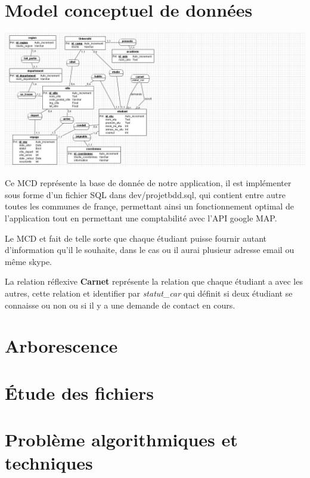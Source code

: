 \documentclass[a4paper,10pt]{report}
\begin{document}
\section{Model conceptuel de donn\'ees}

\begin{center}
    \includegraphics[scale=0.8]{../dev/mcd_covoiturage.jpg}
\end{center}

Ce MCD repr\'esente la base de donn\'ee de notre application, il est impl\'ementer
sous forme d'un fichier SQL dans dev/projetbdd.sql, qui contient entre autre toutes
les communes de fran\c{c}e, permettant ainsi un fonctionnement optimal de l'application
tout en permettant une comptabilit\'e avec l'API google MAP.

Le MCD et fait de telle sorte que chaque \'etudiant puisse fournir autant d'information
qu'il le souhaite, dans le cas ou il aurai plusieur adresse email ou m\^eme skype.

La relation r\'eflexive \textbf{Carnet} repr\'esente la relation que chaque \'etudiant
a avec les autres, cette relation et identifier par \textit{statut\_car} qui d\'efinit 
si deux \'etudiant se connaisse ou non ou si il y a une demande de contact en cours.

\section{Arborescence}



\section{\'Etude des fichiers}

\section{Probl\`eme algorithmiques et techniques}
\end{document}
